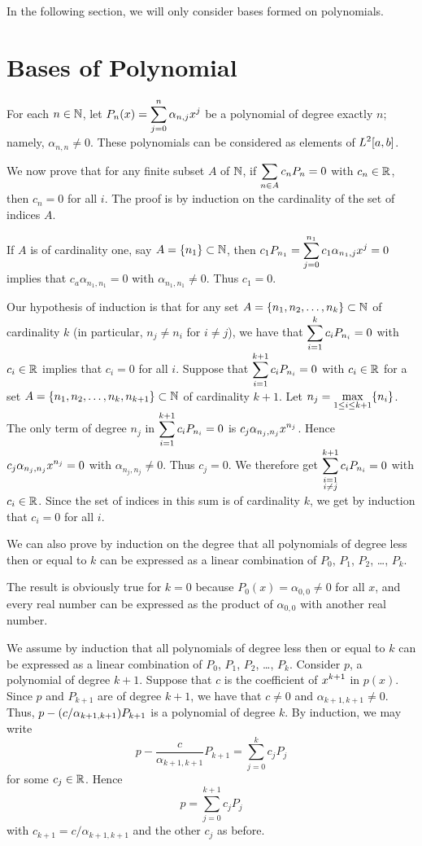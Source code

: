 In the following section, we will only consider bases formed on
polynomials.

\section{Bases of Polynomial} 

For each $n \in \mathbb{N}$, let
$\displaystyle P_n(x) = \sum_{j=0}^n \alpha_{n,j}x^j$ be a
polynomial of degree exactly $n$; namely, $\alpha_{n,n} \neq 0$.
These polynomials can be considered as elements of $\displaystyle L^2[a,b]$.

We now prove that for any finite subset $A$ of $\mathbb{N}$, if
$\displaystyle \sum_{n\in A} c_n P_n = 0$ with $c_n \in \mathbb{R}$,
then $c_n =0$ for all $i$.  The proof is by induction on the
cardinality of the set of indices $A$.

If $A$ is of cardinality one, say $A = \{ n_1\} \subset \mathbb{N}$,
then $\displaystyle c_1 P_{n_1} = \sum_{j=0}^{n_1} c_1 \alpha_{n_1,j}x^j = 0$
implies that $c_a \alpha_{n_1,n_1} = 0$ with $\alpha_{n_1,n_1} \neq 0$.
Thus $c_1 = 0$.

Our hypothesis of induction is that for any set
$A = \{ n_1, n_2, \ldots , n_k \} \subset \mathbb{N}$ of
cardinality $k$ (in particular, $n_j \neq n_i$ for $i\neq j$), we have that
$\displaystyle \sum_{i=1}^k c_i P_{n_i} = 0$ with $c_i \in \mathbb{R}$
implies that $c_i = 0$ for all $i$.  Suppose that
$\displaystyle \sum_{i=1}^{k+1} c_i P_{n_i} = 0$ with $c_i \in \mathbb{R}$ for
a set $A = \{ n_1, n_2, \ldots , n_k,n_{k+1} \} \subset \mathbb{N}$ of
cardinality $k+1$.  Let $\displaystyle n_j = \max_{1\leq i \leq k+1}\{ n_i\}$.
The only term of degree $n_j$ in
$\displaystyle \sum_{i=1}^{k+1} c_i P_{n_i} = 0$
is $\displaystyle c_j \alpha_{n_j,n_j} x^{n_j}$.  Hence
$\displaystyle c_j \alpha_{n_j,n_j}x^{n_j} = 0$
with $\alpha_{n_j,n_j} \neq 0$.  Thus $c_j=0$.  We
therefore get
$\displaystyle \sum_{\substack{i=1\\i\neq j}}^{k+1} c_i P_{n_i} = 0$ with
$c_i \in \mathbb{R}$.
Since the set of indices in this sum is of cardinality $k$, we get by
induction that $c_i = 0$ for all $i$.

We can also prove by induction on the degree that all polynomials of
degree less then or equal to $k$ can be expressed as a linear
combination of $P_0$, $P_1$, $P_2$, \ldots, $P_k$.

The result is obviously true for $k=0$ because $P_0(x)= \alpha_{0,0}\neq 0$
for all $x$, and every real number can be expressed as the
product of $\alpha_{0,0}$ with another real number.

We assume by induction that all polynomials of degree less then or
equal to $k$ can be expressed as a linear combination of $P_0$, $P_1$,
$P_2$, \ldots, $P_k$.  Consider $p$, a 
polynomial of degree $k+1$.  Suppose that $c$ is the coefficient of
$\displaystyle x^{k+1}$ in $p(x)$.  Since $p$ and $P_{k+1}$ are of
degree $k+1$, we have that $c\neq 0$ and $\alpha_{k+1,k+1} \neq 0$.  Thus,
$\displaystyle p - (c/\alpha_{k+1,k+1}) P_{k+1}$ is a polynomial of
degree $k$.  By induction, we may write
\[
p - \frac{c}{\alpha_{k+1,k+1}} P_{k+1} = \sum_{j=0}^k c_j P_j
\]
for some $c_j \in \mathbb{R}$.  Hence
\[
p = \sum_{j=0}^{k+1} c_j P_j
\]
with $c_{k+1} = c/\alpha_{k+1,k+1}$ and the other $c_j$ as before.

